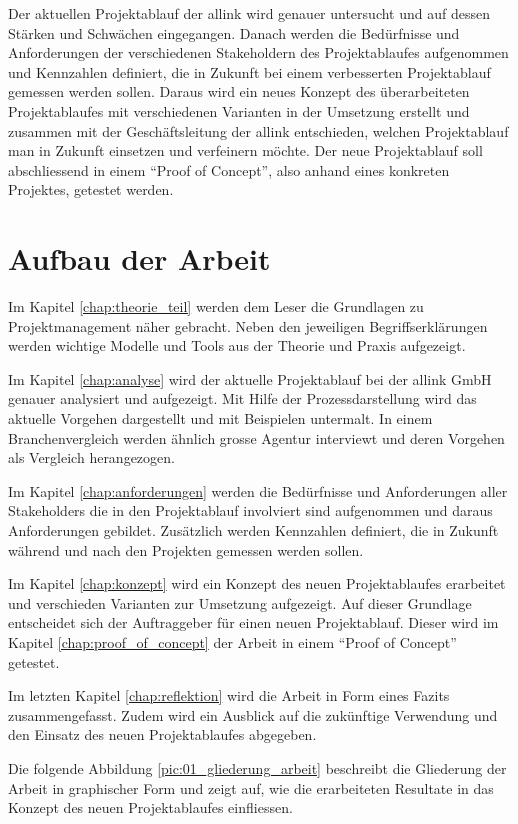 Der aktuellen Projektablauf der allink wird genauer untersucht und auf 
dessen Stärken und Schwächen eingegangen. Danach werden die Bedürfnisse und 
Anforderungen der verschiedenen Stakeholdern des Projektablaufes aufgenommen und
Kennzahlen definiert, die in Zukunft bei einem verbesserten Projektablauf gemessen 
werden sollen. Daraus wird ein neues Konzept des überarbeiteten Projektablaufes 
mit verschiedenen Varianten in der Umsetzung erstellt und zusammen mit der 
Geschäftsleitung der allink entschieden, welchen Projektablauf 
man in Zukunft einsetzen und verfeinern möchte. Der neue Projektablauf soll 
abschliessend in einem ``Proof of Concept'', also anhand eines konkreten Projektes, 
getestet werden.

\section{Aufbau der Arbeit}
Im Kapitel \ref{chap:theorie_teil} werden dem Leser die Grundlagen zu Projektmanagement 
näher gebracht. Neben den jeweiligen Begriffserklärungen werden wichtige Modelle 
und Tools aus der Theorie und Praxis aufgezeigt.

Im Kapitel \ref{chap:analyse} wird der aktuelle Projektablauf bei der allink
GmbH genauer analysiert und aufgezeigt. Mit Hilfe der Prozessdarstellung wird
das aktuelle Vorgehen dargestellt und mit Beispielen untermalt. In einem
Branchenvergleich werden ähnlich grosse Agentur interviewt und deren Vorgehen
als Vergleich herangezogen.

Im Kapitel \ref{chap:anforderungen} werden die Bedürfnisse und Anforderungen 
aller Stakeholders die in den Projektablauf involviert sind aufgenommen und daraus
Anforderungen gebildet. Zusätzlich werden Kennzahlen definiert, die in Zukunft
während und nach den Projekten gemessen werden sollen.

Im Kapitel \ref{chap:konzept} wird ein Konzept des neuen Projektablaufes
erarbeitet und verschieden Varianten zur Umsetzung aufgezeigt. Auf dieser Grundlage
entscheidet sich der Auftraggeber für einen neuen Projektablauf. Dieser wird
im Kapitel \ref{chap:proof_of_concept} der Arbeit in einem ``Proof of Concept'' 
getestet.

Im letzten Kapitel \ref{chap:reflektion} wird die Arbeit in Form eines Fazits 
zusammengefasst. Zudem wird ein Ausblick auf die zukünftige Verwendung und den 
Einsatz des neuen Projektablaufes abgegeben.

Die folgende Abbildung \ref{pic:01_gliederung_arbeit} beschreibt die Gliederung der 
Arbeit in graphischer Form und zeigt auf, wie die erarbeiteten Resultate in
das Konzept des neuen Projektablaufes einfliessen.

